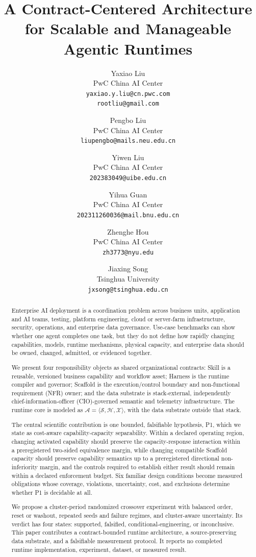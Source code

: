 \documentclass[11pt]{article}
\title{A Contract-Centered Architecture for Scalable and Manageable Agentic Runtimes}
\author{%
Yaxiao Liu\\
PwC China AI Center\\
\texttt{yaxiao.y.liu@cn.pwc.com}\\
\texttt{rootliu@gmail.com}
\and
Pengbo Liu\\
PwC China AI Center\\
\texttt{liupengbo@mails.neu.edu.cn}
\and
Yiwen Liu\\
PwC China AI Center\\
\texttt{202383049@uibe.edu.cn}
\and
Yihua Guan\\
PwC China AI Center\\
\texttt{202311260036@mail.bnu.edu.cn}
\and
Zhenghe Hou\\
PwC China AI Center\\
\texttt{zh3773@nyu.edu}
\and
Jiaxing Song\\
Tsinghua University\\
\texttt{jxsong@tsinghua.edu.cn}
}
\date{}
\begin{document}
\maketitle


\begin{abstract}
Enterprise AI deployment is a coordination problem across business units, application and AI teams, testing, platform engineering, cloud or server-farm infrastructure, security, operations, and enterprise data governance. Use-case benchmarks can show whether one agent completes one task, but they do not define how rapidly changing capabilities, models, runtime mechanisms, physical capacity, and enterprise data should be owned, changed, admitted, or evidenced together.

We present four responsibility objects as shared organizational contracts: Skill is a reusable, versioned business capability and workflow asset; Harness is the runtime compiler and governor; Scaffold is the execution/control boundary and non-functional requirement (NFR) owner; and the data substrate is stack-external, independently chief-information-officer (CIO)-governed semantic and telemetry infrastructure. The runtime core is modeled as $\mathcal{A}=\langle\mathcal{S},\mathcal{H},\mathcal{X}\rangle$, with the data substrate outside that stack.

The central scientific contribution is one bounded, falsifiable hypothesis, P1, which we state as cost-aware capability-capacity separability. Within a declared operating region, changing activated capability should preserve the capacity-response interaction within a preregistered two-sided equivalence margin, while changing compatible Scaffold capacity should preserve capability semantics up to a preregistered directional non-inferiority margin, and the controls required to establish either result should remain within a declared enforcement budget. Six familiar design conditions become measured obligations whose coverage, violations, uncertainty, cost, and exclusions determine whether P1 is decidable at all.

We propose a cluster-period randomized crossover experiment with balanced order, reset or washout, repeated seeds and failure regimes, and cluster-aware uncertainty. Its verdict has four states: supported, falsified, conditional-engineering, or inconclusive. This paper contributes a contract-bounded runtime architecture, a source-preserving data substrate, and a falsifiable measurement protocol. It reports no completed runtime implementation, experiment, dataset, or measured result.
\end{abstract}
\end{document}
